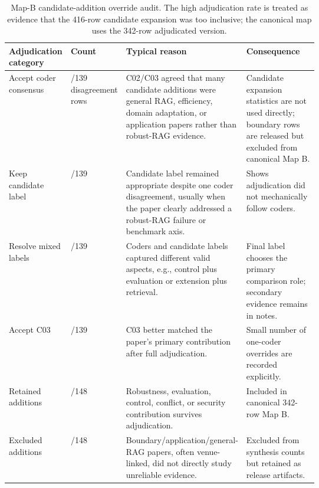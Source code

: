 \documentclass[11pt]{article}
\begin{document}
\begin{table}[t]
\centering
\scriptsize
\renewcommand{\arraystretch}{0.9}
\begin{tabularx}{\linewidth}{>{\raggedright\arraybackslash}p{0.20\linewidth}>{\raggedright\arraybackslash}p{0.17\linewidth}>{\raggedright\arraybackslash}p{0.24\linewidth}X}
\toprule
\textbf{Adjudication category} & \textbf{Count} & \textbf{Typical reason} & \textbf{Consequence} \\
\midrule
Accept coder consensus & 114/139 disagreement rows & C02/C03 agreed that many candidate additions were general RAG, efficiency, domain adaptation, or application papers rather than robust-RAG evidence. & Candidate expansion statistics are not used directly; boundary rows are released but excluded from canonical Map B. \\
Keep candidate label & 14/139 & Candidate label remained appropriate despite one coder disagreement, usually when the paper clearly addressed a robust-RAG failure or benchmark axis. & Shows adjudication did not mechanically follow coders. \\
Resolve mixed labels & 7/139 & Coders and candidate labels captured different valid aspects, e.g., control plus evaluation or extension plus retrieval. & Final label chooses the primary comparison role; secondary evidence remains in notes. \\
Accept C03 & 4/139 & C03 better matched the paper's primary contribution after full adjudication. & Small number of one-coder overrides are recorded explicitly. \\
\midrule
Retained additions & 74/148 & Robustness, evaluation, control, conflict, or security contribution survives adjudication. & Included in canonical 342-row Map B. \\
Excluded additions & 74/148 & Boundary/application/general-RAG papers, often venue-linked, did not directly study unreliable evidence. & Excluded from synthesis counts but retained as release artifacts. \\
\bottomrule
\end{tabularx}
\caption{Map-B candidate-addition override audit. The high adjudication rate is treated as evidence that the 416-row candidate expansion was too inclusive; the canonical map uses the 342-row adjudicated version.}
\label{tab:map-b-override-audit}
\end{table}


\end{document}
